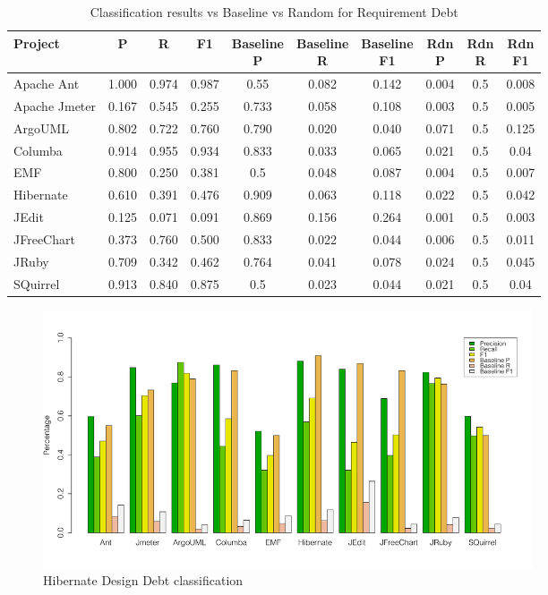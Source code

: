 \begin{table}[!hbt]
    \begin{center}
        \caption{Classification results vs Baseline vs Random for Requirement Debt}
        \label{tbl:classifier_results_vs_baseline_requirement}
        \begin{tabular}{l| c c c c c c c c c}
        \toprule
        \textbf{Project} & \textbf{P} & \textbf{R} & \textbf{F1} & \thead{Baseline\\P} & \thead{Baseline\\R} & \thead{Baseline\\F1} & \thead{Rdn\\P} & \thead{Rdn\\R} & \thead{Rdn\\F1} \\
        \midrule
        Apache Ant    & 1.000 &  0.974 &  0.987 & 0.55  & 0.082 & 0.142  & 0.004 &0.5 & 0.008  \\
        Apache Jmeter & 0.167 &  0.545 &  0.255 & 0.733 & 0.058 & 0.108  & 0.003 &0.5 & 0.005  \\
        ArgoUML       & 0.802 &  0.722 &  0.760 & 0.790 & 0.020 & 0.040  & 0.071 &0.5 & 0.125  \\
        Columba       & 0.914 &  0.955 &  0.934 & 0.833 & 0.033 & 0.065  & 0.021 &0.5 &  0.04  \\
        EMF           & 0.800 &  0.250 &  0.381 & 0.5   & 0.048 & 0.087  & 0.004 &0.5 & 0.007  \\
        Hibernate     & 0.610 &  0.391 &  0.476 & 0.909 & 0.063 & 0.118  & 0.022 &0.5 & 0.042  \\
        JEdit         & 0.125 &  0.071 &  0.091 & 0.869 & 0.156 & 0.264  & 0.001 &0.5 & 0.003  \\
        JFreeChart    & 0.373 &  0.760 &  0.500 & 0.833 & 0.022 & 0.044  & 0.006 &0.5 & 0.011  \\
        JRuby         & 0.709 &  0.342 &  0.462 & 0.764 & 0.041 & 0.078  & 0.024 &0.5 & 0.045  \\
        SQuirrel      & 0.913 &  0.840 &  0.875 & 0.5   & 0.023 & 0.044  & 0.021 &0.5 &  0.04  \\
        \bottomrule
        \end{tabular}
    \end{center}    
\end{table}

\clearpage

\begin{figure}[thb!]
  \centering
  \includegraphics[width=0.70\textwidth]{figures/baseline_comparison_design.pdf}
  \caption{Hibernate Design Debt classification}
  \label{fig:design_hibernate}
\end{figure}

